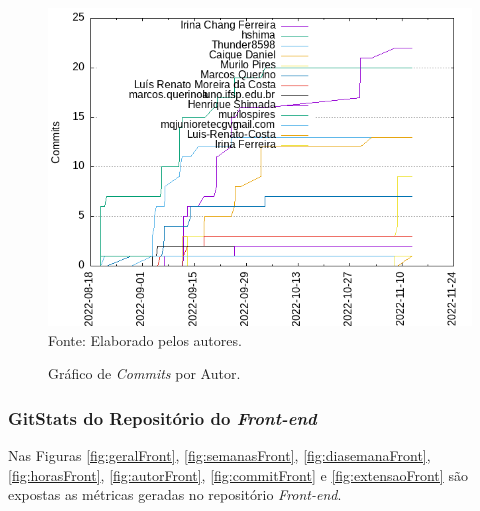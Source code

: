 \documentclass[
    12pt,               %
    openright,          %
    oneside,
    a4paper,            %
    BIBLATEX,           %
    TODO,               %
    english,            %
    brazil              %
    ]{ifsp-spo-inf-ctds}
\begin{document}
    \begin{figure}[H]
            \centering
            \caption{Gráfico de \emph{Commits} por Autor.}
            \includegraphics[width=1 \textwidth]{Gitstats/documento/commitsPorAuthor.png}
            {\footnotesize Fonte: Elaborado pelos autores.}
            \label{fig:commitautor}
    \end{figure} 



\subsubsection{GitStats do Repositório do \emph{Front-end}}
    Nas Figuras \ref{fig:geralFront}, \ref{fig:semanasFront}, \ref{fig:diasemanaFront}, \ref{fig:horasFront}, \ref{fig:autorFront}, \ref{fig:commitFront} e \ref{fig:extensaoFront} são expostas as métricas geradas no repositório \emph{Front-end}.
\end{document}
